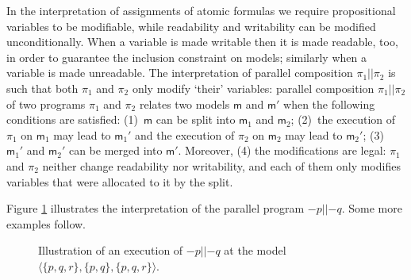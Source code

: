 \documentclass{llncs}
\newcommand{\modl}{\mathsf m}
\newcommand{\pll}{ {||} }							%
\newcommand{\assgnbotV}[1]{{\mathtt {-} #1}}
\newcommand{\set}[1]{\{#1\}}
\newcommand{\tuple}[1]{ \langle #1 \rangle}
\begin{document}
In the interpretation of assignments of atomic formulas we require 
propositional variables to be modifiable, while 
readability and writability can be modified unconditionally.
When a variable is made writable then it is made readable, too, 
in order to guarantee the inclusion constraint on models; 
similarly when a variable is made unreadable. 
%
The interpretation of parallel composition $\pi_1 \pll \pi_2$ is such that both $\pi_1$ and $\pi_2$ only modify `their' variables: 
parallel composition $\pi_1 \pll \pi_2$ of two programs $\pi_1$ and $\pi_2$ 
relates two models $\modl$ and $\modl'$ when the following conditions are satisfied:
(1)~$\modl$ can be split into $\modl_1$ and $\modl_2$; 
(2)~the execution of $\pi_1$ on $\modl_1$ may lead to $\modl_1'$ and 
    the execution of $\pi_2$ on $\modl_2$ may lead to $\modl_2'$;
(3)~$\modl_1'$ and $\modl_2'$ can be merged into $\modl'$. 
Moreover, 
(4) the modifications are legal: $\pi_1$ and $\pi_2$ neither change readability nor writability, and 
each of them only modifies variables that were allocated to it by the split. 

Figure \ref{fig:ex:parallel} illustrates the interpretation of the parallel program $\assgnbotV p \pll \assgnbotV q$. 
Some more examples follow. 

\begin{figure}[t]
  \centering
  
\caption{Illustration of an execution of $\assgnbotV p \pll \assgnbotV q$ at the model $\tuple{ \set{p,q,r} , \set{p,q} , \set{p,q,r} } $. 
}
\label{fig:ex:parallel} 
\end{figure}
\end{document}
